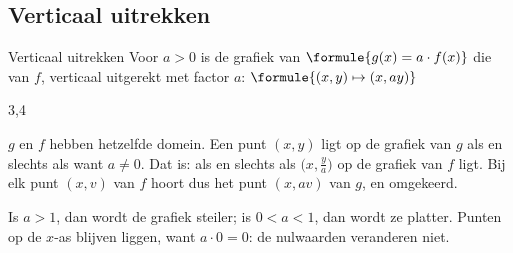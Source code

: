 \subsection{Verticaal uitrekken}

\begin{theorie}
\begin{stelling}{Verticaal uitrekken}
Voor $a > 0$ is de grafiek van $\formule{g(x) = a \cdot f(x)}$ die van $f$, verticaal uitgerekt met factor $a$: \quad $\formule{(x, y) \mapsto (x, ay)}$
\end{stelling}

\begin{alleenvoor}{3,4}
\begin{bewijs}
$g$ en $f$ hebben hetzelfde domein. Een punt $(x, y)$ ligt op de grafiek van $g$ als en slechts als
want $a \neq 0$. Dat is: als en slechts als $\bigl(x, \frac{y}{a}\bigr)$ op de grafiek van $f$ ligt. Bij elk punt $(x, v)$ van $f$ hoort dus het punt $(x, av)$ van $g$, en omgekeerd.
\end{bewijs}
\end{alleenvoor}
\end{theorie}

Is $a > 1$, dan wordt de grafiek steiler; is $0 < a < 1$, dan wordt ze platter. Punten op de $x$-as blijven liggen, want $a \cdot 0 = 0$: de nulwaarden veranderen niet.


\begin{oefeningen}
\end{oefeningen}

